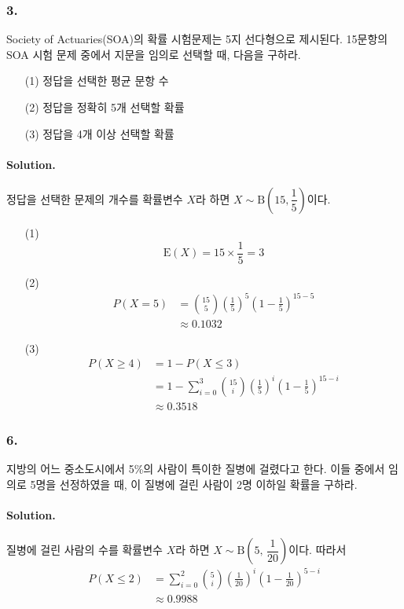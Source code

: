 \subsubsection{3.} Society of Actuaries(SOA)의 확률 시험문제는 5지 선다형으로 제시된다. 15문항의 SOA 시험 문제 중에서 지문을 임의로 선택할 때, 다음을 구하라.

\begin{itemize}
	\item [(1)] 정답을 선택한 평균 문항 수
    \item [(2)] 정답을 정확히 5개 선택할 확률
    \item [(3)] 정답을 4개 이상 선택할 확률
\end{itemize}

\paragraph{Solution.} 정답을 선택한 문제의 개수를 확률변수 $X$라 하면 $X \sim \mathrm{B}\left(15, \dfrac{1}{5}\right)$이다.
\begin{itemize}
	\item[(1)] \[\mathrm{E}\left(X\right) = 15\times\frac{1}{5} = 3\]
	\item[(2)] {
        \begin{align*}
            P\left(X=5\right) &= \binom{15}{5} \left(\frac{1}{5}\right)^5 \left(1 - \frac{1}{5}\right)^{15-5}\\
            &\approx 0.1032
        \end{align*}
    }
    \item[(3)] {
        \begin{align*}
            P\left(X \geq 4\right) &= 1 - P\left(X \leq 3\right)\\
            &= 1 - \sum_{i = 0}^3 \binom{15}{i} \left(\frac{1}{5}\right)^i \left(1-\frac{1}{5}\right)^{15-i}\\
            &\approx 0.3518
        \end{align*}
    }
\end{itemize}

\subsubsection{6.} 지방의 어느 중소도시에서 5\%의 사람이 특이한 질병에 걸렸다고 한다. 이들 중에서 임의로 5명을 선정하였을 때, 이 질병에 걸린 사람이 2명 이하일 확률을 구하라.

\paragraph{Solution.} 질병에 걸린 사람의 수를 확률변수 $X$라 하면 $X \sim \mathrm{B}\left(5,\,\dfrac{1}{20}\right)$이다. 따라서
\begin{align*}
    P\left(X \leq 2\right) &= \sum_{i = 0}^2 \binom{5}{i} \left(\frac{1}{20}\right)^i \left(1-\frac{1}{20}\right)^{5 - i}\\
    &\approx 0.9988
\end{align*}

